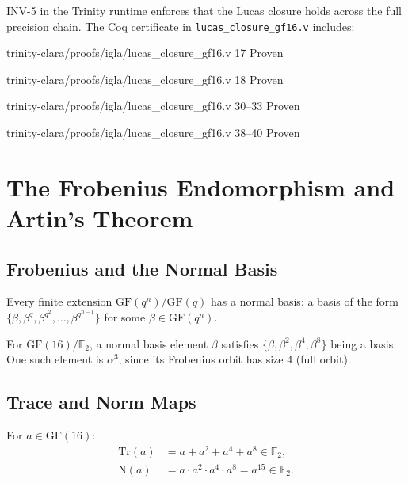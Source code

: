 INV-5 in the Trinity runtime enforces that the Lucas closure holds
across the full precision chain.
The Coq certificate in \texttt{lucas\_closure\_gf16.v} includes:

%
        {trinity-clara/proofs/igla/lucas\_closure\_gf16.v}%
        {17}%
        {Proven}

%
        {trinity-clara/proofs/igla/lucas\_closure\_gf16.v}%
        {18}%
        {Proven}

%
        {trinity-clara/proofs/igla/lucas\_closure\_gf16.v}%
        {30--33}%
        {Proven}

%
        {trinity-clara/proofs/igla/lucas\_closure\_gf16.v}%
        {38--40}%
        {Proven}

\section{The Frobenius Endomorphism and Artin's Theorem}
\label{sec:gf16-frobenius}

\subsection{Frobenius and the Normal Basis}

\begin{theorem}
\label{thm:normal-basis}
Every finite extension \(\mathrm{GF}(q^n)/\mathrm{GF}(q)\) has a normal basis:
a basis of the form \(\{\beta, \beta^q, \beta^{q^2},\ldots,\beta^{q^{n-1}}\}\)
for some \(\beta\in\mathrm{GF}(q^n)\).
\end{theorem}

For \(\mathrm{GF}(16)/\mathbb{F}_2\), a normal basis element \(\beta\)
satisfies \(\{\beta,\beta^2,\beta^4,\beta^8\}\) being a basis.
One such element is \(\alpha^3\), since its Frobenius orbit has size 4
(full orbit).

\subsection{Trace and Norm Maps}

\begin{definition}
\label{def:trace-norm}
For \(a\in\mathrm{GF}(16)\):
\begin{align*}
  \mathrm{Tr}(a) &= a + a^2 + a^4 + a^8 \in \mathbb{F}_2,\\
  \mathrm{N}(a)  &= a \cdot a^2 \cdot a^4 \cdot a^8 = a^{15} \in \mathbb{F}_2.
\end{align*}
\end{definition}


